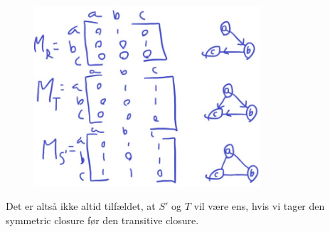 \documentclass[a4paper,12pt]{article}
\begin{document}
\begin{figure}[H]
    \centering
    \includegraphics[width=0.75\textwidth]{img2.png}
    \caption{}
\end{figure}

Det er altså ikke altid tilfældet, at $S'$ og $T$ vil være ens, hvis vi tager den symmetric closure før den transitive closure.
\end{document}
